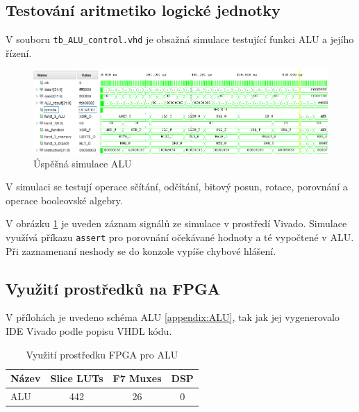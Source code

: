 \documentclass[FM,BP]{tulthesis}
\begin{document}
\subsection{Testování aritmetiko logické jednotky}
V souboru \verb|tb_ALU_control.vhd| je obsažná simulace testující funkci ALU a jejího řízení.

\begin{figure}[h]
    \centering
    \includegraphics[width=\textwidth]{assets/ALU_simulation.png}
    \caption{Úspěšná simulace ALU}
    \label{img:ALU_simulace}
\end{figure}

\newpage

V simulaci se testují operace sčítání, odčítání, bitový posun, rotace, porovnání a  operace booleovské algebry.

V obrázku \ref{img:ALU_simulace} je uveden záznam signálů ze simulace v prostředí Vivado. 
Simulace využívá příkazu \verb|assert| pro porovnání očekávané hodnoty a té vypočtené v ALU. Při zaznamenaní neshody se do konzole vypíše chybové hlášení. 

\subsection{Využití prostředků na FPGA}
V přílohách je uvedeno schéma ALU \ref{appendix:ALU}, tak jak jej vygenerovalo IDE Vivado podle popisu VHDL kódu. 

\begin{table}[h]
    \caption{Využití prostředku FPGA pro ALU}
    \label{table:ALU_resources}
    \begin{center}
        \begin{tabular}{|l|c|c|c|}
        \hline
        \textbf{Název} & \textbf{Slice LUTs} & \textbf{F7 Muxes} & \textbf{DSP} \\
        \hline
        ALU & 442 & 26 & 0 \\
        \hline
        \end{tabular}
    \end{center}
\end{table}
\end{document}
